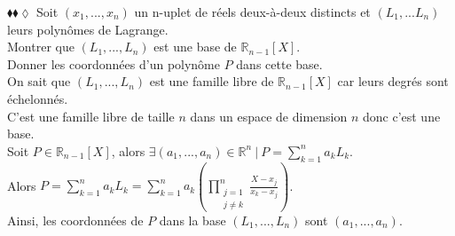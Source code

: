 \documentclass[11pt]{article}
\newcommand*{\R}{\mathbb{R}}
\begin{document}
\begin{exercise}{$\blacklozenge\blacklozenge\lozenge$}{}
    Soit $(x_1, ..., x_n)$ un n-uplet de réels deux-à-deux distincts et $(L_1,...L_n)$ leurs polynômes de Lagrange.\\
    Montrer que $(L_1, ..., L_n)$ est une base de $\R_{n-1}[X]$.\\
    Donner les coordonnées d'un polynôme $P$ dans cette base.
    \tcblower\\[0.2cm]
    On sait que $(L_1, ..., L_n)$ est une famille libre de $\R_{n-1}[X]$ car leurs degrés sont échelonnés.\\
    C'est une famille libre de taille $n$ dans un espace de dimension $n$ donc c'est une base.\\
    Soit $P\in\R_{n-1}[X]$, alors $\exists (a_1, ..., a_n) \in \R^n ~ | ~ P = \sum_{k=1}^n a_kL_k$.\\
    Alors $P = \sum_{k=1}^n a_kL_k = \sum_{k=1}^n a_k\left(\prod_{\substack{j=1\\j\neq k}}^n \frac{X-x_j}{x_k-x_j}\right)$.\\
    Ainsi, les coordonnées de $P$ dans la base $(L_1, ..., L_n)$ sont $(a_1, ..., a_n)$.
\end{exercise}
\end{document}
